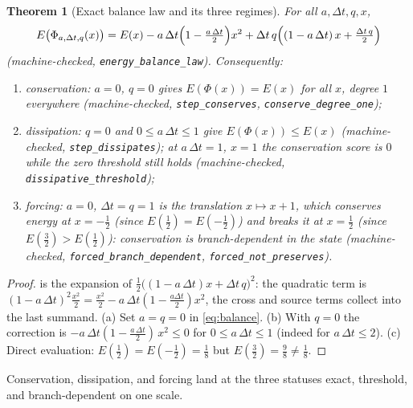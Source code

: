 \documentclass[11pt,a4paper]{article}
\newtheorem{theorem}{Theorem}[section]
\begin{document}
\begin{theorem}[Exact balance law and its three regimes]
\label{thm:energy}
For all $a, \Delta t, q, x$,
\begin{equation}
\label{eq:balance}
  E\bigl(\Phi_{a,\Delta t,q}(x)\bigr)
  = E(x)
    - a\,\Delta t\Bigl(1 - \tfrac{a\,\Delta t}{2}\Bigr)x^2
    + \Delta t\,q\Bigl((1 - a\,\Delta t)\,x
      + \tfrac{\Delta t\,q}{2}\Bigr)
\end{equation}
(machine-checked, \texttt{energy\_balance\_law}).
Consequently:
\begin{enumerate}[label=\textup{(\alph*)},nosep]
\item \emph{conservation}: $a = 0$, $q = 0$ gives
  $E(\Phi(x)) = E(x)$ for all $x$, degree $1$ everywhere
  (machine-checked, \texttt{step\_conserves},
  \texttt{conserve\_degree\_one});
\item \emph{dissipation}: $q = 0$ and $0 \le a\,\Delta t \le 1$ give
  $E(\Phi(x)) \le E(x)$
  (machine-checked, \texttt{step\_dissipates}); at
  $a\,\Delta t = 1$, $x = 1$ the conservation score is $0$ while the
  zero threshold still holds
  (machine-checked, \texttt{dissipative\_threshold});
\item \emph{forcing}: $a = 0$, $\Delta t = q = 1$ is the translation
  $x \mapsto x + 1$, which conserves energy at $x = -\tfrac{1}{2}$
  (since $E(\tfrac{1}{2}) = E(-\tfrac{1}{2})$) and breaks it at
  $x = \tfrac{1}{2}$ (since $E(\tfrac{3}{2}) > E(\tfrac{1}{2})$):
  conservation is branch-dependent in the state
  (machine-checked, \texttt{forced\_branch\_dependent},
  \texttt{forced\_not\_preserves}).
\end{enumerate}
\end{theorem}
\begin{proof}
 is the expansion of
$\tfrac{1}{2}\bigl((1 - a\,\Delta t)x + \Delta t\,q\bigr)^2$:
the quadratic term is
$(1 - a\,\Delta t)^2 \tfrac{x^2}{2}
= \tfrac{x^2}{2} - a\,\Delta t(1 - \tfrac{a \Delta t}{2})x^2$,
the cross and source terms collect into the last summand.
(a) Set $a = q = 0$ in \cref{eq:balance}.
(b) With $q = 0$ the correction is
$-a\,\Delta t(1 - \tfrac{a\,\Delta t}{2})\,x^2 \le 0$ for
$0 \le a\,\Delta t \le 1$ (indeed for $a\,\Delta t \le 2$).
(c) Direct evaluation:
$E(\tfrac{1}{2}) = E(-\tfrac{1}{2}) = \tfrac{1}{8}$ but
$E(\tfrac{3}{2}) = \tfrac{9}{8} \neq \tfrac{1}{8}$.
\end{proof}

Conservation, dissipation, and forcing land at the three statuses
exact, threshold, and branch-dependent on one scale.
\end{document}
